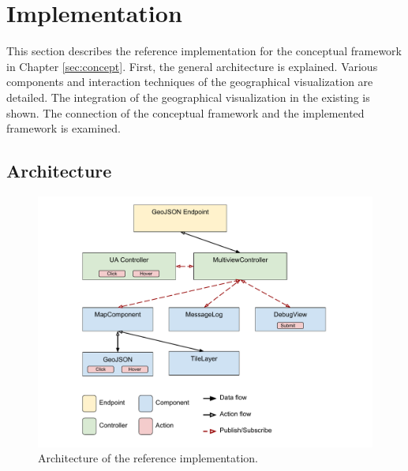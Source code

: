 \chapter{Implementation}\label{sec:implementation}


This section describes the reference implementation for the conceptual framework in Chapter \ref{sec:concept}.
First, the general architecture is explained.
Various components and interaction techniques of the geographical visualization are detailed.
The integration of the geographical visualization in the existing \visan{} is shown.
The connection of the conceptual framework and the implemented framework is examined.

\section{Architecture}


\begin{figure}[ht]
  \centering
  \includegraphics[width=\textwidth]{figures/implementation/thesis-architecture.pdf}
  \caption{%
    Architecture of the reference implementation.
  }\label{fig:implementation:architecture}
\end{figure}

